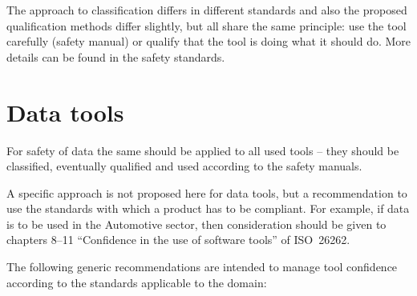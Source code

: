 The approach to classification differs in different standards and also the proposed qualification methods differ slightly,
but all share the same principle: use the tool carefully (safety manual) or qualify that the tool is doing what it should do.
More details can be found in the safety standards.

\section{Data tools}
 
For safety of data the same should be applied to all used tools -- they should be classified, eventually qualified and used according to the safety manuals.
 
A specific approach is not proposed here for data tools,
but a recommendation to use the standards with which a product has to be compliant.
For example, if data is to be used in the Automotive sector,
then consideration should be given to chapters 8--11 ``Confidence in the use of  software tools'' of ISO\ 26262.
 
The following generic recommendations are intended to manage tool confidence according to the standards applicable to the domain:

